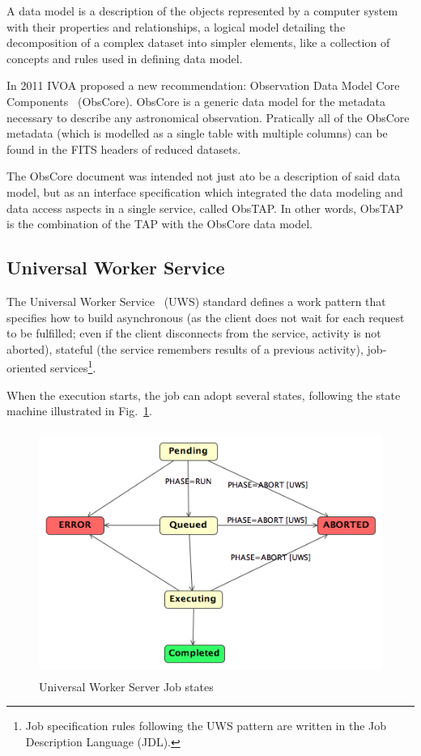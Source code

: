 A data model is a description of the objects represented by a computer system with their properties and relationships, a logical model detailing the decomposition of a complex dataset into simpler elements, like a collection of concepts and rules used in defining data model. 

In 2011 IVOA proposed a new recommendation: Observation Data Model Core
Components~\cite{2011arXiv1111.1758L} (ObsCore). ObsCore is a 
generic data model for the metadata necessary to describe any astronomical observation. Pratically all of the ObsCore metadata (which is modelled as a single table with multiple columns) can be found in the FITS headers of reduced datasets.

The ObsCore document was intended not just ato be a description of said data model, but as an interface specification which integrated the data modeling and data access aspects in a single service, called ObsTAP.
In other words, ObsTAP is the combination of the TAP with the ObsCore data model.


\subsection{Universal Worker Service} %
\label{sub:universal_worker_service}

The Universal Worker Service~\cite{2010uws..irec.....H} (UWS) 
standard defines a work
pattern 
that specifies
how to build asynchronous (as the client does not wait for each request to be fulfilled; even if the client disconnects from the service, activity is not aborted), stateful (the service remembers results of a previous activity), job-oriented
services\footnote{Job specification rules following the UWS pattern are written in the Job Description Language (JDL).}.

When the execution starts, the job can adopt several states, following the state machine illustrated in Fig.~\ref{fig:jobstatuses}.

\begin{figure}[tb]
\centering
\includegraphics[height=8cm]{images/UWSStates.png}
\caption{Universal Worker Server Job states}
\label{fig:jobstatuses}
\end{figure}

